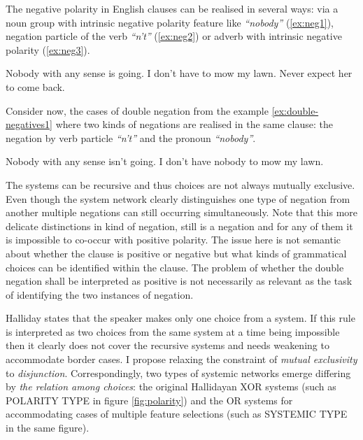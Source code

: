 The negative polarity in English clauses can be realised in several ways: via a noun group with intrinsic negative polarity feature like \textit{``nobody''} (\ref{ex:neg1}), negation particle of the verb \textit{``n't''} (\ref{ex:neg2}) or adverb with intrinsic negative polarity (\ref{ex:neg3}). 

\begin{exe}
	\ex\label{ex:neg1} Nobody with any sense is going. 
	\ex\label{ex:neg2} I don't have to mow my lawn.
	\ex\label{ex:neg3} Never expect her to come back.
\end{exe}

Consider now, the cases of double negation from the example \ref{ex:double-negatives1} where two kinds of negations are realised in the same clause: the negation by verb particle \textit{``n't''} and the pronoun \textit{``nobody''}. 

\begin{exe}
	\ex \label{ex:double-negatives1}
	Nobody with any sense isn't going. 
	\ex \label{ex:double-negatives2} I don’t have nobody to mow my lawn.
\end{exe}

The systems can be recursive and thus choices are not always mutually exclusive. Even though the system network  clearly distinguishes one type of negation from another multiple negations can still occurring simultaneously. Note that this more delicate distinctions in kind of negation, still is a negation and for any of them it is impossible to co-occur with positive polarity. 
The issue here is not semantic about whether the clause is positive or negative but what kinds of grammatical choices can be identified within the clause. The problem of whether the double negation shall be interpreted as positive is not necessarily as relevant as the task of identifying the two instances of negation. 

Halliday states that the speaker makes only one choice from a system. If this rule is interpreted as two choices from the same system at a time being impossible then it clearly does not cover the recursive systems and needs weakening to accommodate border cases. I propose relaxing the constraint of \textit{mutual exclusivity} to \textit{disjunction}. Correspondingly, two types of systemic networks emerge differing by \textit{the relation among choices}: the original Hallidayan XOR systems (such as POLARITY TYPE in figure \ref{fig:polarity}) and the OR systems for accommodating cases of multiple feature selections (such as SYSTEMIC TYPE in the same figure).


